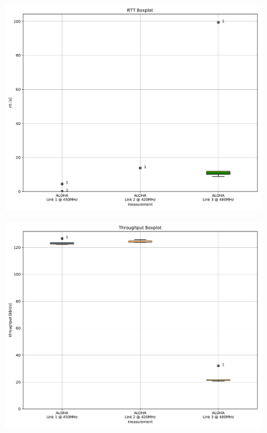 \documentclass{article}
\begin{document}
\begin{figure}
	\includegraphics[width=\textwidth]{aloha_single/boxplot/rtt_boxplot}
\end{figure}

\begin{figure}
	\includegraphics[width=\textwidth]{aloha_single/boxplot/throughput_boxplot}
\end{figure}
\end{document}
